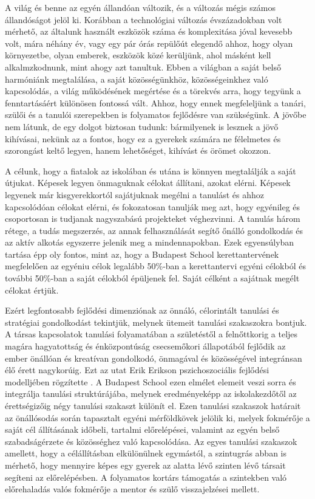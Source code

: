 A világ és benne az egyén állandóan változik, és a változás mégis számos állandóságot jelöl ki. Korábban a technológiai változás évszázadokban volt mérhető, az általunk használt eszközök száma és komplexitása jóval kevesebb volt, mára
néhány év, vagy egy pár órás repülőút elegendő ahhoz, hogy olyan környezetbe, olyan emberek, eszközök közé kerüljünk, ahol másként kell alkalmzkodnunk, mint ahogy azt tanultuk. Ebben a világban a saját belső harmóniánk megtalálása, a saját közösségünkhöz, közösségeinkhez való kapcsolódás, a világ működésének megértése és a törekvés arra, hogy tegyünk a fenntartásáért különösen fontossá vált. Ahhoz, hogy ennek megfeleljünk a tanári, szülői és a tanulói szerepekben is folyamatos fejlődésre van szükségünk. 
A jövőbe nem látunk, de egy dolgot biztosan tudunk: bármilyenek is lesznek a jövő
kihívásai, nekünk az a fontos, hogy ez a gyerekek számára ne félelmetes és
szorongást keltő legyen, hanem lehetőséget, kihívást és örömet okozzon.

A célunk, hogy a fiatalok az iskolában és utána is könnyen megtalálják a saját útjukat. Képesek legyen önmaguknak célokat állítani, azokat elérni. Képesek legyenek már kisgyerekkortól sajátjuknak megélni a tanulást és ahhoz kapcsolódóan célokat elérni, és fokozatosan tanulják meg azt, hogy egyénileg és csoportosan is tudjanak nagyszabású projekteket véghezvinni.
A tanulás három rétege, a tudás megszerzés, az annak felhasználását segítő őnálló gondolkodás és az aktív alkotás egyszerre jelenik meg a mindennapokban. Ezek egyensúlyban tartása épp oly fontos, mint az, hogy a Budapest School kerettantervének megfelelően az egyéniu célok legalább 50\%-ban a kerettantervi egyéni célokból és további 50\%-ban a saját célokból épüljenek fel. Saját célként a sajátnak megélt célokat értjük.

Ezért legfontosabb fejlődési dimenziónak az önnáló, célorintált tanulási és stratégiai gondolkodást tekintjük, melynek ütemeit tanulási szakaszokra bontjuk. A társas kapcsolatok tanulási folyamatában a születéstől a felnőttkorig a teljes magára hagyatottság és énközpontúság csecsemőkori állapotából fejlődik az ember önállóan és kreatívan gondolkodó, önmagával és közösségével integránsan élő érett nagykorúig. Ezt az utat Erik Erikson pszichoszociális fejlődési modelljében rögzítette \citep{Erikson91}. A Budapest School ezen elmélet elemeit veszi sorra és integrálja tanulási struktúrájába, melynek eredményeképp az iskolakezdőtől az érettségizőig négy tanulási szakaszt különít el. Ezen tanulási szakaszok határait az önállósodás során tapasztalt egyéni mérföldkövek jelölik ki, melyek fokmérője a saját cél állításának időbeli, tartalmi előrelépései, valamint az egyén belső szabadságérzete és közösséghez való kapcsolódása. 
Az egyes tanulási szakaszok amellett, hogy a célállításban elkülönülnek egymástól, a szintugrás abban is mérhető, hogy mennyire képes egy gyerek az alatta lévő szinten lévő társait segíteni az előrelépésben. A folyamatos kortárs támogatás a szintekben való előrehaladás valós fokmérője a mentor és szülő visszajelzései mellett. 

